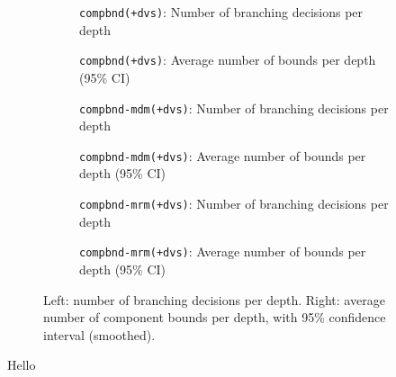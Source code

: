 \begin{figure}
	\centering

	\begin{subfigure}{0.495\textwidth}
		\centering
		
		\caption{\texttt{compbnd(+dvs)}: Number of branching decisions per depth}
		\label{fig:compbnd_depths_distribution}
	\end{subfigure}
	\hfill
	\begin{subfigure}{0.495\textwidth}
		\centering
		
		\caption{\texttt{compbnd(+dvs)}: Average number of bounds per depth (95\% CI)}
		\label{fig:compbnd_avg_num_bounds_vs_depth}
	\end{subfigure}

	\vspace{1em}

	\begin{subfigure}{0.495\textwidth}
		\centering
		
		\caption{\texttt{compbnd-mdm(+dvs)}: Number of branching decisions per depth}
		\label{fig:compbnd-mdm_depths_distribution}
	\end{subfigure}
	\hfill
	\begin{subfigure}{0.495\textwidth}
		\centering
		
		\caption{\texttt{compbnd-mdm(+dvs)}: Average number of bounds per depth (95\% CI)}
		\label{fig:compbnd-mdm_avg_num_bounds_vs_depth}
	\end{subfigure}

	\vspace{1em}

	\begin{subfigure}{0.495\textwidth}
		\centering
		
		\caption{\texttt{compbnd-mrm(+dvs)}: Number of branching decisions per depth}
		\label{fig:compbnd-mrm_depths_distribution}
	\end{subfigure}
	\hfill
	\begin{subfigure}{0.495\textwidth}
		\centering
		
		\caption{\texttt{compbnd-mrm(+dvs)}: Average number of bounds per depth (95\% CI)}
		\label{fig:compbnd-mrm_avg_num_bounds_vs_depth}
	\end{subfigure}

	\caption{Left: number of branching decisions per depth. Right: average number of component bounds per depth, with 95\% confidence interval (smoothed).}
	\label{fig:comparison_depth}
\end{figure}

Hello
